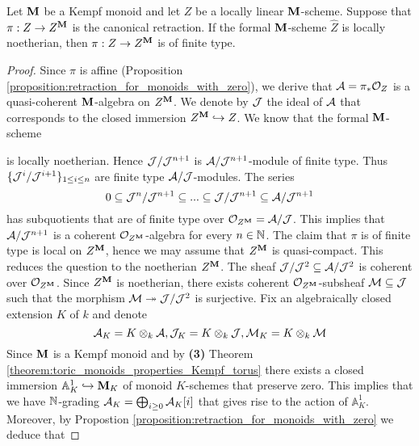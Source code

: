 \begin{theorem}
Let $\mathbf{M}$ be a Kempf monoid and let $Z$ be a locally linear $\mathbf{M}$-scheme. Suppose that $\pi:Z\rightarrow Z^{\mathbf{M}}$ is the canonical retraction. If the formal $\mathbf{M}$-scheme $\widehat{Z}$ is locally noetherian, then $\pi:Z\rightarrow Z^{\mathbf{M}}$ is of finite type.
\end{theorem}
\begin{proof}
Since $\pi$ is affine (Proposition \ref{proposition:retraction_for_monoids_with_zero}), we derive that ${\mathcal A} = \pi_*{\mathcal O}_Z$ is a quasi-coherent $\mathbf{M}$-algebra on $Z^{\mathbf{M}}$. We denote by ${\mathcal J}$ the ideal of ${\mathcal A}$ that corresponds to the closed immersion $Z^{\mathbf{M}}\hookrightarrow Z$. We know that the formal $\mathbf{M}$-scheme
\begin{center}
\end{center}
is locally noetherian. Hence ${\mathcal J}/{\mathcal J}^{n+1}$ is ${\mathcal A}/{\mathcal J}^{n+1}$-module of finite type. Thus $\{{\mathcal J}^i/{\mathcal J}^{i+1}\}_{1\leq i\leq n}$ are finite type ${\mathcal A}/{\mathcal J}$-modules. The series
$$0 \subseteq {\mathcal J}^n/{\mathcal J}^{n+1} \subseteq  ... \subseteq {\mathcal J}/{\mathcal J}^{n+1} \subseteq {\mathcal A}/{\mathcal J}^{n+1}$$
has subquotients that are of finite type over ${\mathcal O}_{Z^{\mathbf{M}}} = {\mathcal A}/{\mathcal J}$. This implies that ${\mathcal A}/{\mathcal J}^{n+1}$ is a coherent ${\mathcal O}_{Z^{\mathbf{M}}}$-algebra for every $n\in {\mathbb N}$. The claim that $\pi$ is of finite type is local on $Z^{\mathbf{M}}$, hence we may assume that $Z^{\mathbf{M}}$ is quasi-compact. This reduces the question to the noetherian $Z^{\mathbf{M}}$. The sheaf ${\mathcal J}/{\mathcal J}^2\subseteq {\mathcal A}/{\mathcal J}^2$ is coherent over ${\mathcal O}_{Z^{\mathbf{M}}}$. Since $Z^{\mathbf{M}}$ is noetherian, there exists coherent ${\mathcal O}_{Z^{\mathbf{M}}}$-subsheaf ${\mathcal M}\subseteq {\mathcal J}$ such that the morphism ${\mathcal M}\twoheadrightarrow {\mathcal J}/{\mathcal J}^2$ is surjective. Fix an algebraically closed extension $K$ of $k$ and denote
$${\mathcal A}_K = K\otimes_k{\mathcal A},{\mathcal J}_K = K\otimes_k{\mathcal J},{\mathcal M}_K = K\otimes_k{\mathcal M}$$
Since $\mathbf{M}$ is a Kempf monoid and by \textbf{(3)} Theorem \ref{theorem:toric_monoids_properties_Kempf_torus} there exists a closed immersion $\mathbb{A}^1_K\hookrightarrow \mathbf{M}_K$ of monoid $K$-schemes that preserve zero. This implies that we have ${\mathbb N}$-grading ${\mathcal A}_K = \bigoplus_{i\geq 0}{\mathcal A}_K[i]$ that gives rise to the action of $\mathbb{A}^1_K$. Moreover, by Propostion \ref{proposition:retraction_for_monoids_with_zero} we deduce that

\end{proof}
